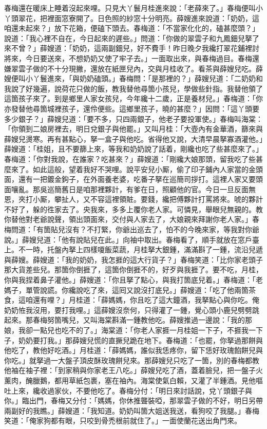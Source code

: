 春梅還在暖床上睡着沒起來哩。{}只見大丫鬟月桂進來說：「老薛來了。」春梅便叫小丫頭翠花，把裡面窓寮開了。日色照的紗窓十分明亮。薛嫂進來說道：「奶奶，這咱還未起來？」放下花箱，便磕下頭去。春梅道：「不當家化化的，磕甚麼頭？」說道：「我心裡不自在，今日起來的遲些。」問道：「你做的翠雲子和九鳳鈿兒拏了來不曾？」薛嫂道：「奶奶，這兩副鈿兒，好不費手！昨日晚夕我纔打翠花鋪裡討將來，今日要送來，不想奶奶又使了牢子去。」一面取出來，與春梅過目。春梅還嫌翠雲子做的不十分現撇，{}還放在紙匣兒內，交與月桂收了。看茶與薛嫂兒吃。薛嫂便叫小丫鬟進來，「與奶奶磕頭。」春梅問：「是那裡的？」薛嫂兒道：「二奶奶和我說了好幾遍，說荷花只做的飯，教我替他尋箇小孩兒，學做些針指。我替他領了這箇孩子來了。到是鄉里人家女孩兒，今年纔十二歲，正是養材兒。」春梅道：「你亦發替他尋箇城裡孩子，還伶便些。這鄉里孩子，曉的甚麼？」因問：「這丫頭要多少銀子？」薛嫂兒道：「要不多，只四兩銀子，他老子要投軍使。」春梅叫海棠：「你領到二娘房裡去，明日兌銀子與他罷。」又叫月桂：「大壺內有金華酒，篩來與薛嫂兒燙寒。再有甚點心，拏一盒子與他吃。省得他又說，大清早晨拏寡酒灌他。」薛嫂道：「桂姐，且不要篩上來，等我和奶奶說了話着，剛纔也吃了些甚麼來了。」春梅道：「你對我說，在誰家？吃甚來？」薛嫂道：「剛纔大娘那頭，留我吃了些甚麼來了。如此這般，望着我好不哭哩。說平安兒小厮，偷了印子鋪內人家當的金頭面，還有一把鍍金鉤子，在外面養老婆，吃番子拏在巡簡司拶打。這裡人家又要頭面嚷亂。那吳巡簡舊日是咱那裡夥計，有爹在日，照顧他的官。今日一旦反面無恩，夾打小厮，攀扯人，又不容這裡領賍。要錢，纔把傅夥計打罵將來。唬的夥計不好了，躲的徃家去了。央我來，多多上覆你老人家。可憐見，舉眼兒無親的。教你替他對老爺說聲，領出頭面來，交付與人家去了，大娘親來拜謝你老人家。」春梅問道：「有箇貼兒沒有？不打緊，你爺出巡去了，怕不的今晚來家，等我對你爺說。」{}薛嫂兒道：「他有說貼兒在此。」向袖中取出。春梅看了，順手就放在窓戶臺上。不一時，托盤內拏上四樣嗄飯菜蔬，月桂拏大銀鍾，滿滿斟了一鍾，流沿兒遞與薛嫂。薛嫂道：「我的奶奶，我怎捱的這大行貨子？」春梅笑道：「比你家老頭子那大貨差些兒。{}那箇你倒捱了，這箇你倒捱不的，好歹與我捱了。要不吃，月桂，你與我捏着鼻子灌他。」薛嫂道：「你且拏了點心，與我打箇底兒着。」春梅道：「老媽子，單管說謊。你纔說吃了來，這囘又說沒打底兒。」薛嫂道：「吃了他兩箇茶食，這咱還有哩？」月桂道：「薛媽媽，你且吃了這大鐘酒，我拏點心與你吃。俺奶奶恠我沒用，要打我哩。」這薛嫂沒奈何，只得灌了一鍾，覺心頭小鹿兒劈劈跳起來。那春梅努箇嘴兒，又叫海棠斟滿一鍾教他吃。薛嫂推過一邊說：「我的那娘，我卻一點兒也吃不的了。」海棠道：「你老人家捱一月桂姐一下子，不捱我一下子，奶奶要打我。」那薛嫂兒慌的直撅兒跪在地下。春梅道：「也罷，你拏過那餅與他吃了，教他好吃酒。」月桂道：「薛媽媽，誰似我恁疼你，留下恁好玫瑰餡餅兒與你吃。」就拏過一大盤子頂皮酥玫瑰餅兒來。那薛嫂兒只吃了一箇，別的春梅都教他袖在袖子裡：「到家稍與你家老王八吃。」薛嫂兒吃了酒，蓋着臉兒，把一盤子火薰肉，醃臘鵝，都用草紙包裹，塞在袖內。{}海棠使氣白賴，又灌了半鍾酒。見他嘔吐上來，纔收過家伙，不要他吃了。春梅分付：「明日來討話說，兌丫頭銀子與你。」臨出門，春梅又分付：「媽媽，你休推聾裝啞，那翠雲子做的不好，明日另帶兩副好的我瞧。」薛嫂道：「我知道。奶奶叫箇大姐送我送，看狗咬了我腿。」春梅笑道：「俺家狗都有眼，只咬到骨禿根前就住了。」{}一面使蘭花送出角門來。

